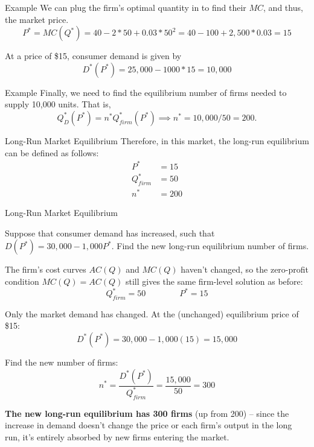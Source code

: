 \documentclass{beamer}
\begin{document}
\begin{frame}{Example}
  We can plug the firm's optimal quantity in to find their $MC$, and thus, the market price.
  $$
    P^* = MC(Q^*) = 40 - 2*50 + 0.03*50^2 = 40 - 100 + 2,500 * 0.03 = 15
  $$

  \bigskip
  At a price of \$15, consumer demand is given by 
  $$
    D^*(P^*) = 25,000 - 1000*15 = 10,000
  $$
\end{frame}

\begin{frame}{Example}
  Finally, we need to find the equilibrium number of firms needed to supply 10,000 units. That is,
  $$
    Q^*_D(P^*) = n^* Q_{firm}^*(P^*) \implies n^* = 10,000 / 50 = 200.
  $$
\end{frame}

\begin{frame}{Long-Run Market Equilibrium}
  Therefore, in this market, the long-run equilibrium can be defined as follows:
  \begin{align*}
    P^*        & =15  \\
    Q^*_{firm} & =50  \\
    n^*        & =200
  \end{align*}
\end{frame}

\begin{frame}{Long-Run Market Equilibrium}


  Suppose that consumer demand has increased, such that $D(P^*)=30,000-1,000P^*$. Find the new long-run equilibrium number of firms.
\end{frame}

\begin{frame}


  The firm's cost curves $AC(Q)$ and $MC(Q)$ haven't changed, so the zero-profit condition $MC(Q)=AC(Q)$ still gives the same firm-level solution as before:
  $$
    Q_{firm}^* = 50 \qquad\qquad P^* = 15
  $$

  Only the market demand has changed. At the (unchanged) equilibrium price of \$15:
  $$
    D^*(P^*) = 30{,}000 - 1{,}000(15) = 15{,}000
  $$

  Find the new number of firms:
  $$
    n^* = \frac{D^*(P^*)}{Q_{firm}^*} = \frac{15{,}000}{50} = 300
  $$

  \textbf{The new long-run equilibrium has 300 firms} (up from 200) -- since the increase in demand doesn't change the price or each firm's output in the long run, it's entirely absorbed by new firms entering the market.
\end{frame}
\end{document}

